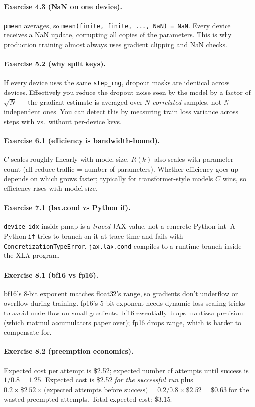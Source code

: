 \documentclass[11pt,a4paper]{article}
\begin{document}
\paragraph{Exercise 4.3 (NaN on one device).}
\texttt{pmean} averages, so \texttt{mean(finite, finite, ..., NaN) = NaN}. Every device
receives a NaN update, corrupting all copies of the parameters. This is why production
training almost always uses gradient clipping and NaN checks.

\paragraph{Exercise 5.2 (why split keys).}
If every device uses the same \texttt{step\_rng}, dropout masks are identical across
devices. Effectively you reduce the dropout noise seen by the model by a factor of
$\sqrt{N}$ --- the gradient estimate is averaged over $N$ \emph{correlated} samples, not
$N$ independent ones. You can detect this by measuring train loss variance across steps
with vs.\ without per-device keys.

\paragraph{Exercise 6.1 (efficiency is bandwidth-bound).}
$C$ scales roughly linearly with model size. $R(k)$ also scales with parameter count (all-reduce
traffic = number of parameters). Whether efficiency goes up depends on which grows faster;
typically for transformer-style models $C$ wins, so efficiency rises with model size.

\paragraph{Exercise 7.1 (lax.cond vs Python if).}
\texttt{device\_idx} inside pmap is a \emph{traced} JAX value, not a concrete Python int.
A Python \texttt{if} tries to branch on it at trace time and fails with \texttt{ConcretizationTypeError}.
\texttt{jax.lax.cond} compiles to a runtime branch inside the XLA program.

\paragraph{Exercise 8.1 (bf16 vs fp16).}
bf16's 8-bit exponent matches float32's range, so gradients don't underflow or overflow
during training. fp16's 5-bit exponent needs dynamic loss-scaling tricks to avoid underflow
on small gradients. bf16 essentially drops mantissa precision (which matmul accumulators
paper over); fp16 drops range, which is harder to compensate for.

\paragraph{Exercise 8.2 (preemption economics).}
Expected cost per attempt is \$2.52; expected number of attempts until success is $1/0.8 = 1.25$.
Expected cost is \$2.52 \emph{for the successful run} plus $0.2 \times \$2.52 \times \text{(expected attempts before success)} = 0.2/0.8 \times \$2.52 = \$0.63$
for the wasted preempted attempts. Total expected cost: \$3.15.
\end{document}

